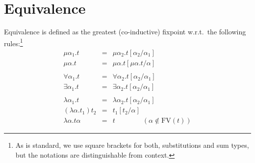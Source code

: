 \documentclass[twoside]{article}
\newcommand{\f}[1]{\mbox{#1}}
\begin{document}
\section{Equivalence}
\label{coreequiv}

Equivalence is defined as the greatest (co-inductive) fixpoint w.r.t.~the following rules:\footnote{As is standard, we use square brackets for both, substitutions and sum types, but the notations are distinguishable from context.}
\begin{eqnarray}
\label{mualpha} \mu \alpha_1.t &=& \mu \alpha_2.t[\alpha_2/\alpha_1] \\
\label{mushao}  \mu \alpha.t &=& \mu \alpha.t[\mu \alpha.t/\alpha] \\
\nonumber\\
\label{forallalpha}\forall \alpha_1.t &=& \forall \alpha_2.t[\alpha_2/\alpha_1] \\
\label{existsalpha} \exists \alpha_1.t &=& \exists \alpha_2.t[\alpha_2/\alpha_1] \\
\nonumber\\
\label{lambdaalpha} \lambda \alpha_1.t &=& \lambda \alpha_2.t[\alpha_2/\alpha_1] \\
\label{lambdabeta}  (\lambda \alpha.t_1) t_2 &=& t_1[t_2/\alpha] \\
\label{lambdaeta}   \lambda \alpha.t \alpha &=& t \qquad\qquad (\alpha\notin\f{FV}(t))
\end{eqnarray}
\end{document}
